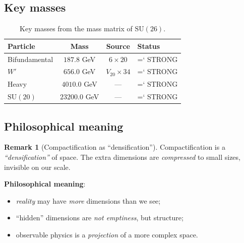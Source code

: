 \documentclass[11pt,a4paper]{article}
\newcommand{\SU}{\mathrm{SU}}
\renewcommand{\texttt}[1]{{\ttfamily\hyphenchar\font=`\- #1}}
\theoremstyle{definition}
\newtheorem{remark}[theorem]{Remark}
\begin{document}
\subsection{Key masses}
\label{subsec:key-masses}

\begin{table}[htbp]
\centering
\caption{Key masses from the mass matrix of $\SU(26)$.}
\label{tab:key-masses}
\begin{tabular}{lccl}
\toprule
Particle & Mass & Source & Status \\ 
\midrule
Bifundamental & $187.8$ GeV & $6 \times 20$ & \texttt{STRONG} \\[0.3em]
$W'$ & $656.0$ GeV & $V_{20} \times 34$ & \texttt{STRONG} \\[0.3em]
Heavy & $4010.0$ GeV & --- & \texttt{STRONG} \\[0.3em]
$\SU(20)$ & $23200.0$ GeV & --- & \texttt{STRONG} \\ 
\bottomrule
\end{tabular}
\end{table}

\subsection{Philosophical meaning}
\label{subsec:comp-philosophy}

\begin{remark}[Compactification as ``densification'']
\label{rem:compactification-philosophy}
Compactification is a \emph{``densification''} of space. 
The extra dimensions are \emph{compressed} to small sizes, 
invisible on our scale.

\medskip\noindent
\textbf{Philosophical meaning}: 
\begin{itemize}
    \item \emph{reality} may have \emph{more} dimensions 
          than we see;
    \item ``hidden'' dimensions are \emph{not emptiness}, 
          but structure;
    \item observable physics is a \emph{projection} 
          of a more complex space.
\end{itemize}
\end{remark}
\end{document}
